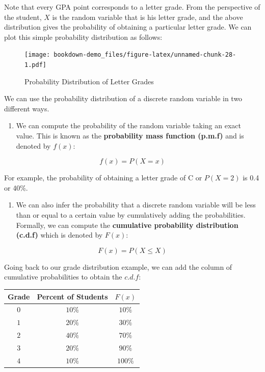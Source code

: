 \documentclass[
]{book}
\providecommand{\tightlist}{%
  \setlength{\itemsep}{0pt}\setlength{\parskip}{0pt}}
\theoremstyle{definition}
\theoremstyle{definition}
\theoremstyle{definition}
\theoremstyle{definition}
\theoremstyle{remark}
\begin{document}
Note that every GPA point corresponds to a letter grade. From the perspective of the student, \(X\) is the random variable that is his letter grade, and the above distribution gives the probability of obtaining a particular letter grade. We can plot this simple probability distribution as follows:

\begin{figure}
\centering
\texttt{[image: bookdown-demo\_files/figure-latex/unnamed-chunk-28-1.pdf]}
\caption{\label{fig:unnamed-chunk-28}Probability Distribution of Letter Grades}
\end{figure}

We can use the probability distribution of a discrete random variable in two different ways.

\begin{enumerate}
\def\labelenumi{\arabic{enumi}.}
\tightlist
\item
  We can compute the probability of the random variable taking an exact value. This is known as the \textbf{probability mass function (p.m.f)} and is denoted by \(f(x)\):
\end{enumerate}

\[f(x)=P(X=x)\]

For example, the probability of obtaining a letter grade of C or \(P(X=2)\) is 0.4 or 40\%.

\begin{enumerate}
\def\labelenumi{\arabic{enumi}.}
\setcounter{enumi}{1}
\tightlist
\item
  We can also infer the probability that a discrete random variable will be less than or equal to a certain value by cumulatively adding the probabilities. Formally, we can compute the \textbf{cumulative probability distribution (c.d.f)} which is denoted by \(F(x)\):
\end{enumerate}

\[F(x)=P(X\leq X)\]

Going back to our grade distribution example, we can add the column of cumulative probabilities to obtain the \(c.d.f\):

\begin{longtable}[]{@{}ccc@{}}
\toprule()
Grade & Percent of Students & \(F(x)\) \\
\midrule()
\endhead
\(0\) & \(10\%\) & \(10\%\) \\
\(1\) & \(20\%\) & \(30\%\) \\
\(2\) & \(40\%\) & \(70\%\) \\
\(3\) & \(20\%\) & \(90\%\) \\
\(4\) & \(10\%\) & \(100\%\) \\
\bottomrule()
\end{longtable}
\end{document}
